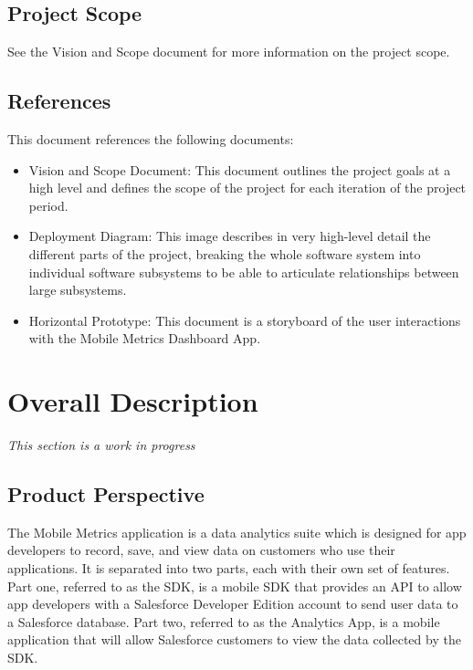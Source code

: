 \documentclass[12pt,oneside,letterpaper]{article}
\begin{document}
\subsection{Project Scope}
See the Vision and Scope document for more information on the project scope.
\subsection{References}
This document references the following documents:
\begin{itemize}
\item Vision and Scope Document: This document outlines the project goals at a high level and defines the scope of the project for each iteration of the project period.
\item Deployment Diagram: This image describes in very high-level detail the different parts of the project, breaking the whole software system into individual software subsystems to be able to articulate relationships between large subsystems.
\item Horizontal Prototype: This document is a storyboard of the user interactions with the Mobile Metrics Dashboard App.
\end{itemize}
\clearpage
\section{Overall Description}
\emph{This section is a work in progress}
\subsection{Product Perspective}
The Mobile Metrics application is a data analytics suite which is designed for app developers to record, save, and view data on customers who use their applications. It is separated into two parts, each with their own set of features. Part one, referred to as the SDK, is a mobile SDK that provides an API to allow app developers with a Salesforce Developer Edition account to send user data to a Salesforce database. Part two, referred to as the Analytics App, is a mobile application that will allow Salesforce customers to view the data collected by the SDK.
\end{document}
